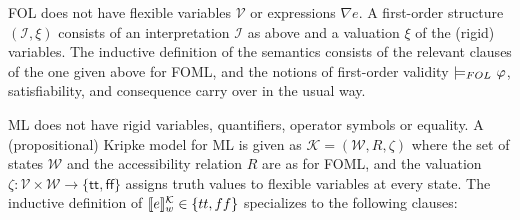 \documentclass{easychair}
\newcommand{\sem}[1]{\ensuremath{[\![ #1 ]\!]}}
\newcommand{\fun}{\rightarrow}
\newcommand{\true}{\textsf{tt}}
\newcommand{\false}{\textsf{ff}}
\newcommand{\folmodels}{\mathop{\models_{\textit{\scriptsize FOL}}}}
\newcommand{\modal}{\nabla}
\newcommand{\II}{\mathcal{I}}
\newcommand{\KK}{\mathcal{K}}
\newcommand{\VV}{\mathcal{V}}
\newcommand{\WW}{\mathcal{W}}
\newcommand{\XX}{\mathcal{X}}
\newcommand{\edmargin}[2]{\marginpar{\raggedright\footnotesize\color{red}#1: #2}}
\newcommand{\edmargin}[2]{}
\def\llnote{\ednote{LL}}
\def\smmargin{\edmargin{SM}}
\let\notla\relax
\begin{document}
FOL does not have flexible variables $\VV$ or expressions $\modal e$.
A first-order structure $(\II,\xi)$ consists of an interpretation $\II$ as above
and a valuation $\xi$ of the (rigid) variables.
The inductive definition of the
semantics consists of the relevant clauses of the one given above for FOML, and
the notions of first-order validity $\folmodels \,\varphi$, satisfiability, and
consequence carry over in the usual way.



ML does not have rigid variables, quantifiers, operator symbols or equality.
A (propositional) Kripke model for ML is given as $\KK = (\WW, R, \zeta)$ where
the set of states $\WW$ and the accessibility relation $R$ are as for FOML, and the
valuation $\zeta: \VV \times \WW \fun \{\true,\false\}$ assigns truth values to
flexible variables at every state. The inductive definition of
$\notla\sem{e}^{\KK}_w \in \{\true,\false\}$ specializes to the following clauses:
\end{document}
